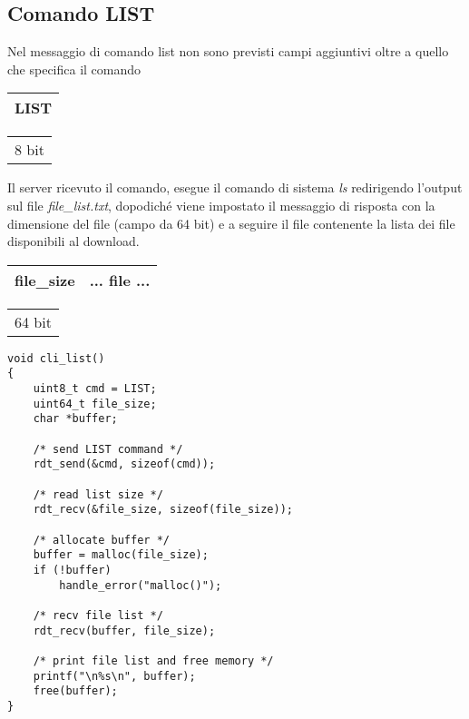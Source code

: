 \subsection{Comando LIST}

Nel messaggio di comando list non sono previsti campi aggiuntivi oltre a quello che specifica il comando
\newline

\begin{tabular}{|c|}
\hline
LIST\\ 
\hline
\end{tabular}

\begin{tabular}{c}
8 bit\\ 
\end{tabular}

Il server ricevuto il comando, esegue il comando di sistema \emph{ls} redirigendo l'output sul file \emph{file\_list.txt}, dopodiché viene impostato il messaggio di risposta con la dimensione del file (campo da 64 bit) e a seguire il file contenente la lista dei file disponibili al download.
\newline


\begin{tabular}{|c|c|}
\hline
file\_size & ...              file              ... \\ 
\hline
\end{tabular}

\begin{tabular}{c}
64 bit\\ 
\end{tabular}


\begin{lstlisting}[title=clicmd.c]
void cli_list()
{
    uint8_t cmd = LIST;
    uint64_t file_size;
    char *buffer;

    /* send LIST command */
    rdt_send(&cmd, sizeof(cmd));

    /* read list size */
    rdt_recv(&file_size, sizeof(file_size));

    /* allocate buffer */
    buffer = malloc(file_size);
    if (!buffer)
        handle_error("malloc()");

    /* recv file list */
    rdt_recv(buffer, file_size);

    /* print file list and free memory */
    printf("\n%s\n", buffer);
    free(buffer);
}                                                                
\end{lstlisting}

